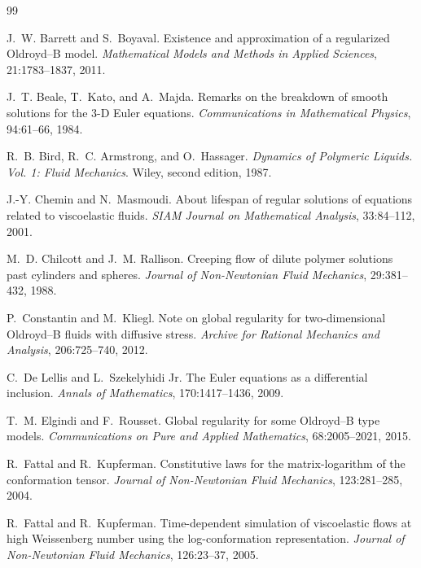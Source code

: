 \documentclass[11pt]{article}
\numberwithin{equation}{section}
\begin{document}
\begin{thebibliography}{99}

J.~W. Barrett and S.~Boyaval.
\newblock Existence and approximation of a regularized Oldroyd--B model.
\newblock \emph{Mathematical Models and Methods in Applied Sciences},
21:1783--1837, 2011.

J.~T. Beale, T.~Kato, and A.~Majda.
\newblock Remarks on the breakdown of smooth solutions for the 3-D Euler
equations.
\newblock \emph{Communications in Mathematical Physics}, 94:61--66, 1984.

R.~B. Bird, R.~C. Armstrong, and O.~Hassager.
\newblock \emph{Dynamics of Polymeric Liquids. Vol. 1: Fluid Mechanics}.
\newblock Wiley, second edition, 1987.

J.-Y. Chemin and N.~Masmoudi.
\newblock About lifespan of regular solutions of equations related to
viscoelastic fluids.
\newblock \emph{SIAM Journal on Mathematical Analysis}, 33:84--112, 2001.

M.~D. Chilcott and J.~M. Rallison.
\newblock Creeping flow of dilute polymer solutions past cylinders and spheres.
\newblock \emph{Journal of Non-Newtonian Fluid Mechanics}, 29:381--432, 1988.

P.~Constantin and M.~Kliegl.
\newblock Note on global regularity for two-dimensional Oldroyd--B fluids with
diffusive stress.
\newblock \emph{Archive for Rational Mechanics and Analysis}, 206:725--740,
2012.

C.~De Lellis and L.~Szekelyhidi Jr.
\newblock The Euler equations as a differential inclusion.
\newblock \emph{Annals of Mathematics}, 170:1417--1436, 2009.

T.~M. Elgindi and F.~Rousset.
\newblock Global regularity for some Oldroyd--B type models.
\newblock \emph{Communications on Pure and Applied Mathematics}, 68:2005--2021,
2015.

R.~Fattal and R.~Kupferman.
\newblock Constitutive laws for the matrix-logarithm of the conformation tensor.
\newblock \emph{Journal of Non-Newtonian Fluid Mechanics}, 123:281--285, 2004.

R.~Fattal and R.~Kupferman.
\newblock Time-dependent simulation of viscoelastic flows at high Weissenberg
number using the log-conformation representation.
\newblock \emph{Journal of Non-Newtonian Fluid Mechanics}, 126:23--37, 2005.


\end{thebibliography}
\end{document}
